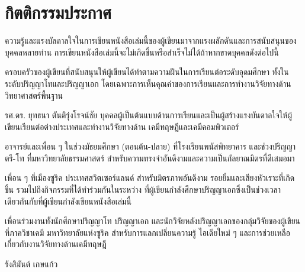 

{

\chapter*{\centering กิตติกรรมประกาศ}

ความรู้และแรงบัลดาลใจในการเขียนหนังสือเล่มนี้ของผู้เขียนมาจากแรงผลักดันและการสนับสนุนของบุคคลหลายท่าน 
การเขียนหนังสือเล่มนี้จะไม่เกิดขึ้นหรือสำเร็จไม่ได้ถ้าหากขาดบุคคลดังต่อไปนี้

ครอบครัวของผู้เขียนที่สนับสนุนให้ผู้เขียนได้ทำตามความฝันในการเรียนต่อระดับอุดมศึกษา ทั้งในระดับปริญญาโทและปริญญาเอก 
โดยเฉพาะการเห็นคุณค่าของการเรียนและการทำงานวิจัยทางด้านวิทยาศาสตร์พื้นฐาน

รศ.ดร. ยุทธนา ตันติรุ่งโรจน์ชัย บุคคลผู้เป็นต้นแบบด้านการเรียนและเป็นผู้สร้างแรงบันดาลใจให้ผู้เขียนเรียนต่อต่างประเทศและทำงานวิจัยทางด้าน%
เคมีทฤษฎีและเคมีคอมพิวเตอร์

อาจารย์และเพื่อน ๆ ในช่วงมัธยมศึกษา (ตอนต้น-ปลาย) ที่โรงเรียนพนัสพิทยาคาร และช่วงปริญญาตรี-โท ที่มหาวิทยาลัยธรรมศาสตร์ 
สำหรับความทรงจำอันดีงามและความเป็นกัลยาณมิตรที่ดีเสมอมา

เพื่อน ๆ ที่เมืองซูริค ประเทศสวิตเซอร์แลนด์ สำหรับมิตรภาพอันดีงาม รอยยิ้มและเสียงหัวเราะที่เกิดขึ้น รวมไปถึงกิจกรรมที่ได้ทำร่วมกันในระหว่าง%
ที่ผู้เขียนกำลังศึกษาปริญญาเอกซึ่งเป็นช่วงเวลาเดียวกันกับที่ผู้เขียนกำลังเขียนหนังสือเล่มนี้

เพื่อนร่วมงานทั้งนักศึกษาปริญญาโท ปริญญาเอก และนักวิจัยหลังปริญญาเอกของกลุ่มวิจัยของผู้เขียนที่ภาควิชาเคมี
มหาวิทยาลัยแห่งซูริค สำหรับการแลกเปลี่ยนความรู้ ไอเดียใหม่ ๆ และการช่วยเหลือเกี่ยวกับงานวิจัยทางด้านเคมีทฤษฎี

\medskip

\begin{flushright}
รังสิมันต์ เกษแก้ว
\end{flushright}
}
